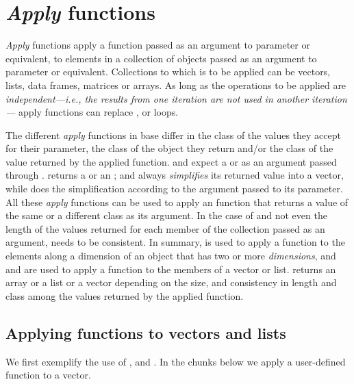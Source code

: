 \documentclass[krantz2]{krantz}\usepackage{knitr}
\begin{document}
\section[Apply functions]{\emph{Apply} functions}\label{sec:data:apply}

\emph{Apply} functions apply a function passed as an argument to parameter  or equivalent, to elements in a collection of \Rlang objects passed as an argument to parameter  or equivalent. Collections to which  is to be applied can be vectors, lists, data frames, matrices or arrays. As long as the operations to be applied are \emph{independent---i.e., the results from one iteration are not used in another iteration---} apply functions can replace ,  or  loops.

The different \emph{apply} functions in base \Rlang differ in the class of the values they accept for their  parameter, the class of the object they return and/or the class of the value returned by the applied function.  and  expect a  or  as an argument passed through .  returns a  or an ; and  always \emph{simplifies} its returned value into a vector, while  does the simplification according to the argument passed to its  parameter. All these \emph{apply} functions can be used to apply an \Rlang function that returns a value of the same or a different class as its argument. In the case of  and  not even the length of the values returned for each member of the collection passed as an argument, needs to be consistent. In summary,  is used to apply a function to the elements along a dimension of an object that has two or more \emph{dimensions}, and  and  are used to apply a function to the members of a vector or list.  returns an array or a list or a vector depending on the size, and consistency in length and class among the values returned by the applied function.

\subsection{Applying functions to vectors and lists}

We first exemplify the use of ,  and . In the chunks below we apply a user-defined function to a vector.
\end{document}
